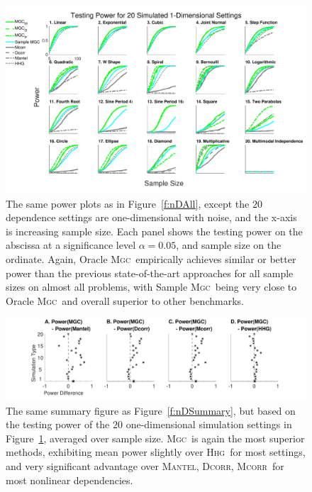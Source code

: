 \documentclass[11pt]{article}
\providecommand{\sct}[1]{{\normalfont\textsc{#1}}}
\newcommand{\Mgc}{\sct{Mgc}}
\newcommand{\Hhg}{\sct{Hhg}}
\newcommand{\Dcorr}{\sct{Dcorr}}
\newcommand{\Mcorr}{\sct{Mcorr}}
\newcommand{\Mantel}{\sct{Mantel}}
\begin{document}
\begin{figure}[htbp]
\includegraphics[width=1.0\textwidth,trim={0 0.5cm 4cm 0},clip]{Figures/Fig1DPowerAll}
\caption{
The same power plots as in Figure~\ref{f:nDAll}, except the $20$ dependence settings are one-dimensional with noise, and the x-axis is increasing sample size.
Each panel shows the testing power on the abscissa at a significance level $\alpha=0.05$, and sample size on the ordinate.
Again, Oracle \Mgc~empirically achieves similar or better power than the previous state-of-the-art approaches for all sample sizes on almost all problems, with Sample \Mgc~being very close to Oracle \Mgc~and overall superior to other benchmarks.}
\label{f:1DAll}
\end{figure}

\begin{figure}
  \centering
  \includegraphics[width=1.0\textwidth,trim={3.5cm 0 3.5cm 0},clip]{Figures/Fig1DPowerMGCM}
  \caption{The same summary figure as Figure~\ref{f:nDSummary}, but based on the testing power of the $20$ one-dimensional simulation settings in Figure~\ref{f:1DAll}, averaged over sample size. 
  \Mgc~is again the most superior methods, exhibiting mean power slightly over \Hhg~for most settings, and very significant advantage over \Mantel, \Dcorr, \Mcorr~for most nonlinear dependencies.}
\label{f:1DSummary}
\end{figure}
\end{document}
